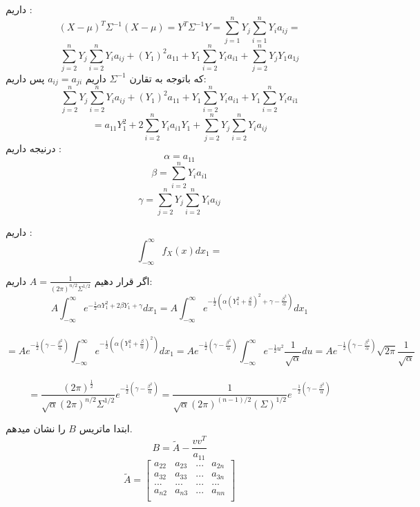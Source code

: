 \parte{}
داریم :
\[ (X-\mu)^{T} \Sigma^{-1} (X-\mu) = Y^{T} \Sigma^{-1} Y = \sum_{j = 1}^{n} {Y_j \sum_{i = 1}^{n} {Y_i a_{ij}}} =\]
 \[  \sum_{j = 2}^{n} {Y_j \sum_{i = 2}^{n} {Y_i a_{ij}}} + 
(Y_1)^2 a_{11}+{Y_1 \sum_{i = 2}^{n} {Y_i a_{i1}}}+ 
\sum_{j = 2}^{n} {Y_j {Y_1 a_{1j}}}\]
که باتوجه به تقارن $\Sigma^{-1}$ داریم
$a_{ij} = a_{ji}$ پس داریم:\\
\[  \sum_{j = 2}^{n} {Y_j \sum_{i = 2}^{n} {Y_i a_{ij}}} + 
(Y_1)^2 a_{11}+{Y_1 \sum_{i = 2}^{n} {Y_i a_{i1}}}+ 
Y_1 \sum_{i = 2}^{n} {Y_i { a_{i1}}}\]
\[ = 
a_{11}Y_1^2 +
{2 \sum_{i = 2}^{n} {Y_i a_{i1}}} Y_1+ 
\sum_{j = 2}^{n} {Y_j \sum_{i = 2}^{n} {Y_i a_{ij}}}
 \]
 درنیجه داریم :\\
\[ \alpha = a_{11} \]
\[\beta = \sum_{i = 2}^{n} {Y_i a_{i1}} \]
\[ \gamma = \sum_{j = 2}^{n} Y_j \sum_{i = 2}^{n} {Y_i a_{ij}}\]

\parte{}
داریم :\\
\[ \int_{-\infty}^{\infty}{f_{X}(x) dx_{1} = }\]

اگر قرار دهیم $A = \frac{1}{{(2\pi)^{n/2} \Sigma^{1/2}}} $ داریم:\\

\[ A \int_{-\infty}^{\infty}e^{-\frac{1}{2} \alpha Y_1^2 + 2\beta Y_1 + \gamma} dx_{1} = 
A \int_{-\infty}^{\infty}e^{-\frac{1}{2} (\alpha (Y_1^2 + \frac{\beta}{\alpha})^2 + \gamma - \frac{\beta^2}{\alpha})} dx_{1} \]
\\
\[ =
    A  e^{-\frac{1}{2}(\gamma - \frac{\beta^2}{\alpha})} \int_{-\infty}^{\infty}e^{-\frac{1}{2} (\alpha (Y_1^2 + \frac{\beta}{\alpha})^2)} dx_{1} = 
    A  e^{-\frac{1}{2}(\gamma - \frac{\beta^2}{\alpha})} \int_{-\infty}^{\infty}e^{-\frac{1}{2} u^2} \frac{1}{\sqrt{\alpha}} du = 
    A  e^{-\frac{1}{2}(\gamma - \frac{\beta^2}{\alpha})} \sqrt{2\pi} \frac{1}{\sqrt{\alpha}}
\]
\\
\[ = 
 \frac{(2\pi)^{\frac{1}{2}}}{\sqrt{\alpha} (2\pi)^{n/2} \Sigma^{1/2}} e^{-\frac{1}{2}(\gamma - \frac{\beta^2}{\alpha})} = 
 \frac{1}{\sqrt{\alpha} (2\pi)^{(n - 1)/2} (\Sigma)^{1/2}} e^{-\frac{1}{2}(\gamma - \frac{\beta^2}{\alpha})} 
\]




\parte{}
ابتدا ماتریس $B$  را نشان میدهم.\\
\[ B = \tilde{A} - \frac{vv^T}{a_{11}}\]
\[
    \tilde{A} = \begin{bmatrix}
    a_{22} & a_{23} & ... & a_{2n} \\
    a_{32} & a_{33} & ... & a_{3n} \\
    ... & ... & ... & ... \\
    a_{n2} & a_{n3} & ... & a_{nn} \\
\end{bmatrix}
\]


